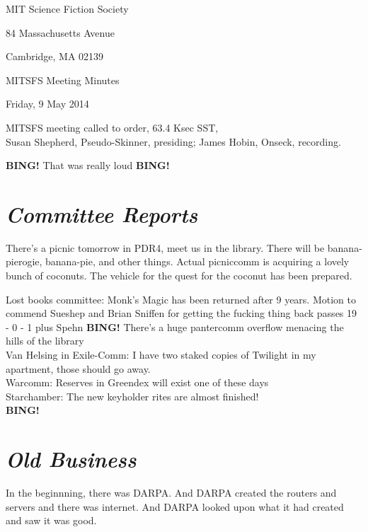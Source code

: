 \documentclass[10pt]{article}
\newcommand{\bing}{{\bf BING!} }
\newcommand{\goto}[1]{\bing \vskip 12pt \section*{{\em{#1}}}}
\newcommand{\ps}{ plus Spehn\xspace}
\newcommand{\skinner}{Susan Shepherd, Pseudo-Skinner}
\newcommand{\onseck}{James Hobin, Onseck}
\newcommand{\meetingdate}{Friday, 9 May 2014}
\begin{document}
\begin{center}

MIT Science Fiction Society

84 Massachusetts Avenue

Cambridge, MA 02139

\vspace{12pt}

MITSFS Meeting Minutes

\meetingdate

\end{center}

\vspace{18pt}

\setlength{\parskip}{6pt}

\noindent
MITSFS meeting called to order, 63.4 Ksec SST, \\
\skinner, presiding; \onseck, recording.

\bing
That was really loud
\goto{Committee Reports}
There's a picnic tomorrow in PDR4, meet us in the library. There will be
banana-pierogie, banana-pie, and other things. Actual picniccomm is acquiring a
lovely bunch of coconuts. The vehicle for the quest for the coconut has been
prepared.

Lost books committee: Monk's Magic has been returned after 9 years.
Motion to commend Sueshep and Brian Sniffen for getting the fucking thing back passes 19 - 0 - 1 \ps
\bing
There's a huge pantercomm overflow menacing the hills of the library \\
Van Helsing in Exile-Comm: I have two staked copies of Twilight in my apartment, those should go away. \\
Warcomm: Reserves in Greendex will exist one of these days \\
Starchamber: The new keyholder rites are almost finished! \\

\goto{Old Business}
In the beginnning, there was DARPA. And DARPA created the routers and servers
and there was internet. And DARPA looked upon what it had created and saw it
was good.
\end{document}
